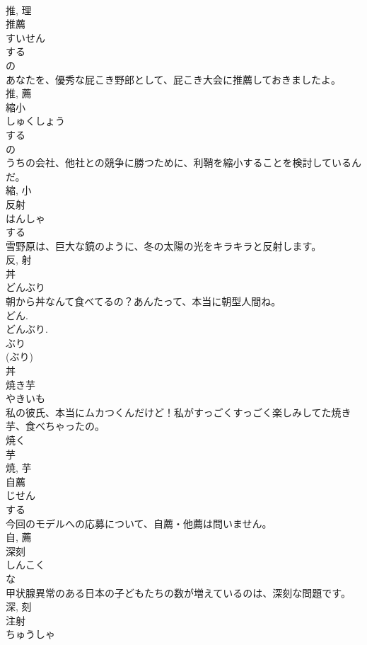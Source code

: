 \documentclass[8pt]{extreport}
\begin{document}
\begin{CJK}{UTF8}{min}
\\	推, 理	
\\	推薦	
\\	すいせん	
\\	する 
\\	の 
\\	あなたを、優秀な屁こき野郎として、屁こき大会に推薦しておきましたよ。	
\\	推, 薦	
\\	縮小	
\\	しゅくしょう	
\\	する 
\\	の 
\\	うちの会社、他社との競争に勝つために、利鞘を縮小することを検討しているんだ。	
\\	縮, 小	
\\	反射	
\\	はんしゃ	
\\	する 
\\	雪野原は、巨大な鏡のように、冬の太陽の光をキラキラと反射します。	
\\	反, 射	
\\	丼	
\\	どんぶり	
\\	朝から丼なんて食べてるの？あんたって、本当に朝型人間ね。	
\\	どん. 
\\	どんぶり. 
\\	ぶり 
\\	(ぶり) 
\\	丼	
\\	焼き芋	
\\	やきいも	
\\	私の彼氏、本当にムカつくんだけど！私がすっごくすっごく楽しみしてた焼き芋、食べちゃったの。	
\\	焼く 
\\	芋 
\\	焼, 芋	
\\	自薦	
\\	じせん	
\\	する 
\\	今回のモデルへの応募について、自薦・他薦は問いません。	
\\	自, 薦	
\\	深刻	
\\	しんこく	
\\	な 
\\	甲状腺異常のある日本の子どもたちの数が増えているのは、深刻な問題です。	
\\	深, 刻	
\\	注射	
\\	ちゅうしゃ	

\end{CJK}
\end{document}
